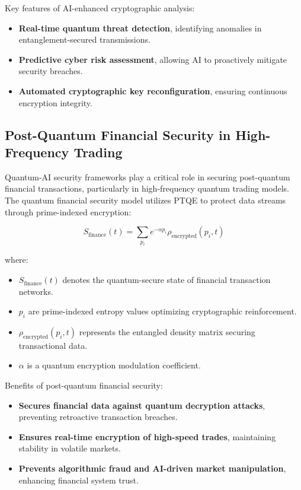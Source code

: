 \documentclass{article}
\theoremstyle{plain}
\begin{document}
\begin{itemize}
Key features of AI-enhanced cryptographic analysis:
\begin{itemize}
    \item \textbf{Real-time quantum threat detection}, identifying anomalies in entanglement-secured transmissions.
    \item \textbf{Predictive cyber risk assessment}, allowing AI to proactively mitigate security breaches.
    \item \textbf{Automated cryptographic key reconfiguration}, ensuring continuous encryption integrity.
\end{itemize}

\subsection{Post-Quantum Financial Security in High-Frequency Trading}

Quantum-AI security frameworks play a critical role in securing post-quantum financial transactions, particularly in high-frequency quantum trading models. The quantum financial security model utilizes PTQE to protect data streams through prime-indexed encryption:

\begin{equation}
    S_{\text{finance}}(t) = \sum_{p_i} e^{-\alpha p_i} \rho_{\text{encrypted}}(p_i, t)
\end{equation}

where:
\begin{itemize}
    \item \( S_{\text{finance}}(t) \) denotes the quantum-secure state of financial transaction networks.
    \item \( p_i \) are prime-indexed entropy values optimizing cryptographic reinforcement.
    \item \( \rho_{\text{encrypted}}(p_i, t) \) represents the entangled density matrix securing transactional data.
    \item \( \alpha \) is a quantum encryption modulation coefficient.
\end{itemize}

Benefits of post-quantum financial security:
\begin{itemize}
    \item \textbf{Secures financial data against quantum decryption attacks}, preventing retroactive transaction breaches.
    \item \textbf{Ensures real-time encryption of high-speed trades}, maintaining stability in volatile markets.
    \item \textbf{Prevents algorithmic fraud and AI-driven market manipulation}, enhancing financial system trust.
\end{itemize}


\end{itemize}
\end{document}
